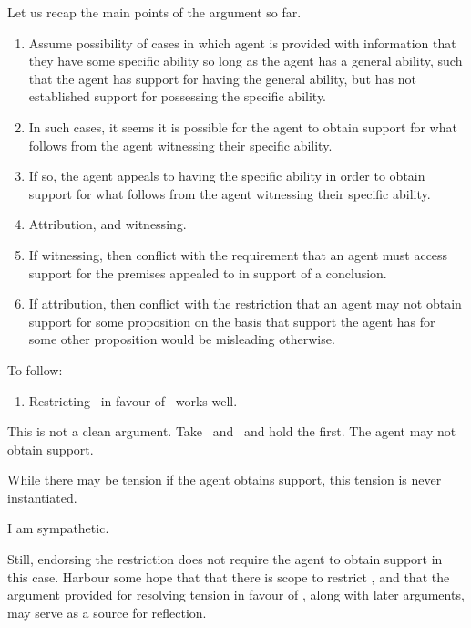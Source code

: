 \begin{note}
  Let us recap the main points of the argument so far.
  \begin{enumerate}
  \item Assume possibility of cases in which agent is provided with information that they have some specific ability so long as the agent has a general ability, such that the agent has support for having the general ability, but has not established support for possessing the specific ability.
  \item In such cases, it seems it is possible for the agent to obtain support for what follows from the agent witnessing their specific ability.
  \item If so, the agent appeals to having the specific ability in order to obtain support for what follows from the agent witnessing their specific ability.
  \item Attribution, and witnessing.
  \item If witnessing, then conflict with the requirement that an agent must access support for the premises appealed to in support of a conclusion.
  \item If attribution, then conflict with the restriction that an agent may not obtain support for some proposition on the basis that support the agent has for some other proposition would be misleading otherwise.
  \end{enumerate}

  To follow:
  \begin{enumerate}
  \item Restricting~\uRa{} in favour of~\rC{} works well.
  \end{enumerate}
\end{note}

\begin{note}
  This is not a clean argument.
  Take~\uRa{} and~\nI{} and hold the first.
  The agent may not obtain support.

  While there may be tension if the agent obtains support, this tension is never instantiated.

  I am sympathetic.

  Still, endorsing the restriction does not require the agent to obtain support in this case.
  Harbour some hope that that there is scope to restrict \uRa{}, and that the argument provided for resolving tension in favour of \rC{}, along with later arguments, may serve as a source for reflection.
\end{note}

